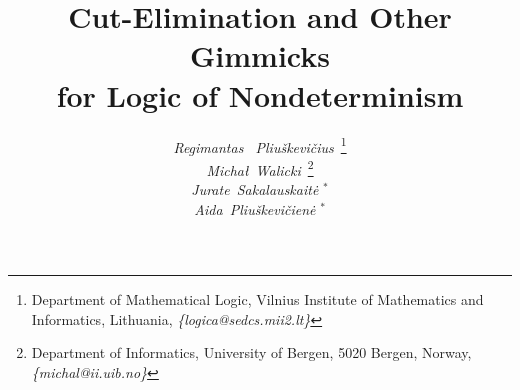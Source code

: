 





\title{Cut-Elimination and Other Gimmicks\\ for Logic of Nondeterminism}

\author{ {\em Regimantas ~Pliu\v skevi\v cius}\ \thanks{Department of Mathematical Logic,
Vilnius Institute of Mathematics and Informatics, Lithuania,
{\sl \{logica@sedcs.mii2.lt\}}} \\
{\em Micha{\l}~Walicki}\ \thanks{Department of Informatics, University of Bergen, 5020
Bergen, Norway, {\sl \{michal@ii.uib.no\}}} \\
{\em Jurate~Sakalauskait\.e }$^*$ \\
{\em Aida~Pliu\v skevi\v cien\.e }$^*$ 
}
%

\maketitle



